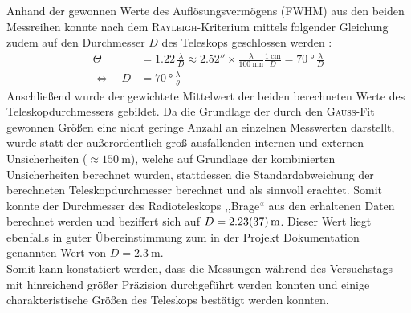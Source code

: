     Anhand der gewonnen Werte des Auflösungsvermögens (FWHM) aus den beiden Messreihen konnte nach dem \textsc{Rayleigh}-Kriterium mittels folgender Gleichung zudem auf den Durchmesser $D$ des Teleskops geschlossen werden \cite{Karttunen2013}:
    \begin{align}
        \Theta &= 1.22 \, \frac{\lambda}{D} \approx \ang{;;2.52} \times \frac{\lambda}{\SI{100}{\nano \metre}} \frac{\SI{1}{\centi \metre}}{D} = \SI{70}{\degree} \, \frac{\lambda}{D}\\
        \Leftrightarrow \quad D &= \SI{70}{\degree} \, \frac{\lambda}{\theta}
    \end{align}
    Anschließend wurde der gewichtete Mittelwert der beiden berechneten Werte des Teleskopdurchmessers gebildet. Da die Grundlage der durch den \textsc{Gauß}-Fit gewonnen Größen eine nicht geringe Anzahl an einzelnen Messwerten darstellt, wurde statt der außerordentlich groß ausfallenden internen und externen Unsicherheiten ($\approx \SI{150}{\metre}$), welche auf Grundlage der kombinierten Unsicherheiten berechnet wurden, stattdessen die Standardabweichung der berechneten Teleskopdurchmesser berechnet und als sinnvoll erachtet. Somit konnte der Durchmesser des Radioteleskops ,,Brage`` aus den erhaltenen Daten berechnet werden und beziffert sich auf $D = \SI{2.23 \pm 0.37}{\metre}$. Dieser Wert liegt ebenfalls in guter Übereinstimmung zum in der Projekt Dokumentation \cite{Usermanual} genannten Wert von $D = \SI{2.3}{\metre}$. \\    
    
    Somit kann konstatiert werden, dass die Messungen während des Versuchstags mit hinreichend größer Präzision durchgeführt werden konnten und einige charakteristische Größen des Teleskops bestätigt werden konnten.